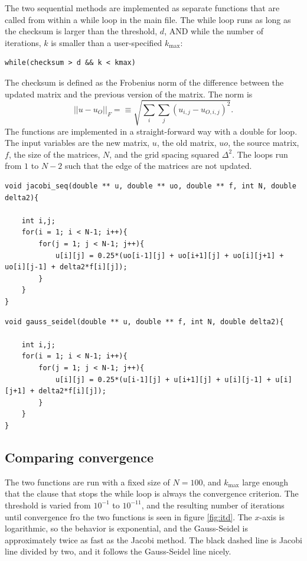 The two sequential methods are implemented as separate functions that are called from within a while loop in the main file. The while loop runs as long as the checksum is larger than the threshold, $d$, AND while the number of iterations, $k$ is smaller than a user-specified $k_\mathrm{max}$:
\begin{lstlisting}
while(checksum > d && k < kmax)
\end{lstlisting}
The checksum is defined as the Frobenius norm of the difference between the updated matrix and the previous version of the matrix. The norm is
\begin{equation}
||u-u_O||_F = \equiv \sqrt{\sum_i\sum_j (u_{i,j}-u_{O, i,j})^2}.
\end{equation}
The functions are implemented in a straight-forward way with a double for loop. The input variables are the new matrix, $u$, the old matrix, $uo$, the source matrix, $f$, the size of the matrices, $N$, and the grid spacing squared $\Delta ^2$. The loops run from $1$ to $N-2$ such that the edge of the matrices are not updated.
\begin{lstlisting}[caption = Implementation of the sequential Jacobi iterative process]
void jacobi_seq(double ** u, double ** uo, double ** f, int N, double delta2){

	int i,j;
	for(i = 1; i < N-1; i++){
		for(j = 1; j < N-1; j++){
			u[i][j] = 0.25*(uo[i-1][j] + uo[i+1][j] + uo[i][j+1] + uo[i][j-1] + delta2*f[i][j]);
		}
	}
}
\end{lstlisting}

\begin{lstlisting}[caption = Implementation of the sequential Gauss-Seidel iterative process]
void gauss_seidel(double ** u, double ** f, int N, double delta2){

	int i,j;
	for(i = 1; i < N-1; i++){
		for(j = 1; j < N-1; j++){
			u[i][j] = 0.25*(u[i-1][j] + u[i+1][j] + u[i][j-1] + u[i][j+1] + delta2*f[i][j]);
		}
	}
}
\end{lstlisting}

\subsection{Comparing convergence}
The two functions are run with a fixed size of $N=100$, and $k_\mathrm{max}$ large enough that the clause that stops the while loop is always the convergence criterion. The threshold is varied from $10^{-1}$ to $10^{-11}$, and the resulting number of iterations until convergence fro the two functions is seen in figure \ref{fig:itd}. The $x$-axis is logarithmic, so the behavior is exponential, and the Gauss-Seidel is approximately twice as fast as the Jacobi method. The black dashed line is Jacobi line divided by two, and it follows the Gauss-Seidel line nicely.

